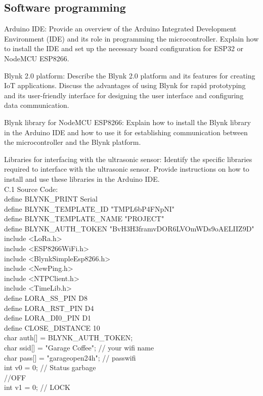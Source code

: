 \documentclass[conference, onecolumn]{IEEEtran}
\begin{document}
\subsection{Software programming}


Arduino IDE: Provide an overview of the Arduino Integrated Development Environment (IDE) and its role in programming the microcontroller. Explain how to install the IDE and set up the necessary board configuration for ESP32 or NodeMCU ESP8266.

Blynk 2.0 platform: Describe the Blynk 2.0 platform and its features for creating IoT applications. Discuss the advantages of using Blynk for rapid prototyping and its user-friendly interface for designing the user interface and configuring data communication.

Blynk library for NodeMCU ESP8266: Explain how to install the Blynk library in the Arduino IDE and how to use it for establishing communication between the microcontroller and the Blynk platform.

Libraries for interfacing with the ultrasonic sensor: Identify the specific libraries required to interface with the ultrasonic sensor. Provide instructions on how to install and use these libraries in the Arduino IDE.\\


C.1 Source Code:\\
define BLYNK_PRINT Serial \\
define BLYNK_TEMPLATE_ID "TMPL6bP4FNpNI"\\
define BLYNK_TEMPLATE_NAME "PROJECT"\\
define BLYNK_AUTH_TOKEN "BvH3H3framvDOR6LVOmWDs9oAELIIZ9D"\\
include <LoRa.h>\\
include <ESP8266WiFi.h>\\
include <BlynkSimpleEsp8266.h>\\
include <NewPing.h>\\
include <NTPClient.h>\\             
include <TimeLib.h>\\  

define LORA_SS_PIN D8\\
define LORA_RST_PIN D4\\
define LORA_DI0_PIN D1\\
define CLOSE_DISTANCE 10\\

char auth[] = BLYNK_AUTH_TOKEN;\\
char ssid[] = "Garage Coffee"; // your wifi name\\
char pass[] = "garageopen24h"; // passwifi\\
int v0 = 0; // Status garbage\\
//OFF\\
int v1 = 0; // LOCK\\
\end{document}
